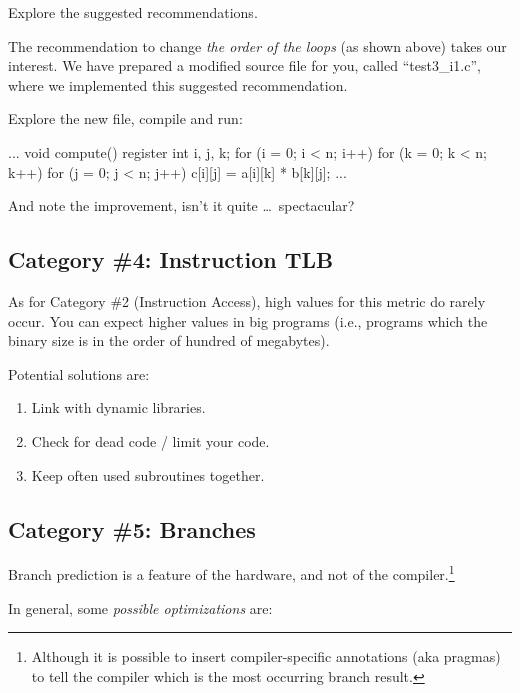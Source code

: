 Explore the suggested recommendations.

The recommendation to change \emph{the order of the loops} (as shown above) takes our interest. We have prepared a modified source file for you, called ``test3\_i1.c'', where we implemented this suggested recommendation.

Explore the new file, compile and run:

\begin{prompt}
...
void compute()
{
register int i, j, k;
for (i = 0; i < n; i++)
  for (k = 0; k < n; k++)
    for (j = 0; j < n; j++)
      c[i][j] = a[i][k] * b[k][j];
}
...
\end{prompt}

And note the improvement, isn't it quite \ldots\  spectacular?

\subsection{Category \#4: Instruction TLB}
\label{subsec:CAT4_Optimizing_Instruction_TLB}

As for Category \#2 (Instruction Access), high values for this metric do rarely occur. You can expect higher values in big programs (i.e., programs which the binary size is in the order of hundred of megabytes).

Potential solutions are:

\begin{enumerate}
  \item  Link with dynamic libraries.
  \item  Check for dead code / limit your code.
  \item  Keep often used subroutines together.
\end{enumerate}

\subsection{Category \#5: Branches}
\label{subsec:CAT5_Optimizing_Branches}

Branch prediction is a feature of the hardware, and not of the compiler.\footnote{Although it is possible to insert compiler-specific annotations (aka pragmas) to tell the compiler which is the most occurring branch result.}

In general, some \emph{possible optimizations} are:

